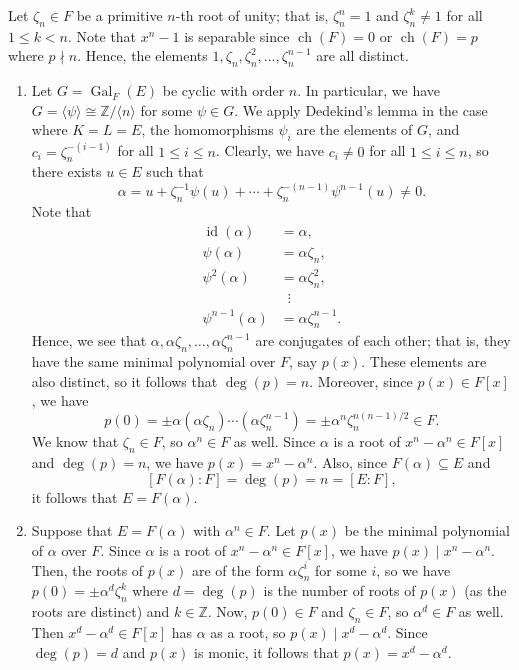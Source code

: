 \documentclass[10pt]{article}
\makeatletter
\newcommand{\Z}{\mathbb{Z}}
\DeclareMathOperator{\ch}{ch}
\DeclareMathOperator{\Gal}{Gal}
\DeclareMathOperator{\id}{id}
\theoremstyle{newstyle}
\newenvironment{pf}[1][\proofname]{\par
  \pushQED{\qed}%
  \normalfont \topsep0\p@\relax
  \trivlist
  \item[\hskip\labelsep\scshape
  #1\@addpunct{.}]\ignorespaces
}{%
  \popQED\endtrivlist\@endpefalse
}
\makeatother
\begin{document}
\begin{pf}
Let $\zeta_n \in F$ be a primitive $n$-th root of unity; that is, $\zeta_n^n = 1$ and 
$\zeta_n^k \neq 1$ for all $1 \leq k < n$. Note that $x^n - 1$ is separable since 
$\ch(F) = 0$ or $\ch(F) = p$ where $p \nmid n$. Hence, the elements 
$1, \zeta_n, \zeta_n^2, \dots, \zeta_n^{n-1}$ are all distinct. 
\begin{enumerate}[(1)]
    \item Let $G = \Gal_F(E)$ be cyclic with order $n$. In particular, we have 
    $G = \langle \psi \rangle \cong \Z/\langle n \rangle$ for some $\psi \in G$. 
    We apply Dedekind's lemma in the case where $K = L = E$, the homomorphisms $\psi_i$ are the 
    elements of $G$, and $c_i = \zeta_n^{-(i-1)}$ for all $1 \leq i \leq n$. Clearly, we have 
    $c_i \neq 0$ for all $1 \leq i \leq n$, so there exists $u \in E$ such that 
    \[ \alpha = u + \zeta_n^{-1} \psi(u) + \cdots + \zeta_n^{-(n-1)} \psi^{n-1}(u) \neq 0. \]
    Note that 
    \begin{align*}
        \id(\alpha) &= \alpha, \\
        \psi(\alpha) &= \alpha\zeta_n, \\
        \psi^2(\alpha) &= \alpha\zeta_n^2, \\
        &\;\;\vdots \\
        \psi^{n-1}(\alpha) &= \alpha\zeta_n^{n-1}. 
    \end{align*}
    Hence, we see that $\alpha, \alpha\zeta_n, \dots, \alpha\zeta_n^{n-1}$ are conjugates of each other; 
    that is, they have the same minimal polynomial over $F$, say $p(x)$. These elements 
    are also distinct, so it follows that $\deg(p) = n$. Moreover, since $p(x) \in F[x]$, we have 
    \[ p(0) = \pm\alpha(\alpha\zeta_n) \cdots (\alpha\zeta_n^{n-1}) = \pm\alpha^n \zeta_n^{n(n-1)/2} \in F. \]
    We know that $\zeta_n \in F$, so $\alpha^n \in F$ as well. Since $\alpha$ is a root of $x^n - \alpha^n
    \in F[x]$ and $\deg(p) = n$, we have $p(x) = x^n - \alpha^n$. Also, since $F(\alpha) \subseteq E$
    and 
    \[ [F(\alpha) : F] = \deg(p) = n = [E : F], \]
    it follows that $E = F(\alpha)$. 
    
    \item Suppose that $E = F(\alpha)$ with $\alpha^n \in F$. Let $p(x)$ be the minimal polynomial 
    of $\alpha$ over $F$. Since $\alpha$ is a root of $x^n - \alpha^n \in F[x]$, we have $p(x) 
    \mid x^n - \alpha^n$. Then, the roots of $p(x)$ are of the form $\alpha\zeta_n^i$ for some 
    $i$, so we have $p(0) = \pm\alpha^d \zeta_n^k$ where $d = \deg(p)$ is the number 
    of roots of $p(x)$ (as the roots are distinct) and $k \in \Z$. Now, 
    $p(0) \in F$ and $\zeta_n \in F$, so $\alpha^d \in F$ as well. Then $x^d - \alpha^d \in F[x]$ 
    has $\alpha$ as a root, so $p(x) \mid x^d - \alpha^d$. Since $\deg(p) = d$ and 
    $p(x)$ is monic, it follows that $p(x) = x^d - \alpha^d$. 
    

\end{enumerate}
\end{pf}
\end{document}
